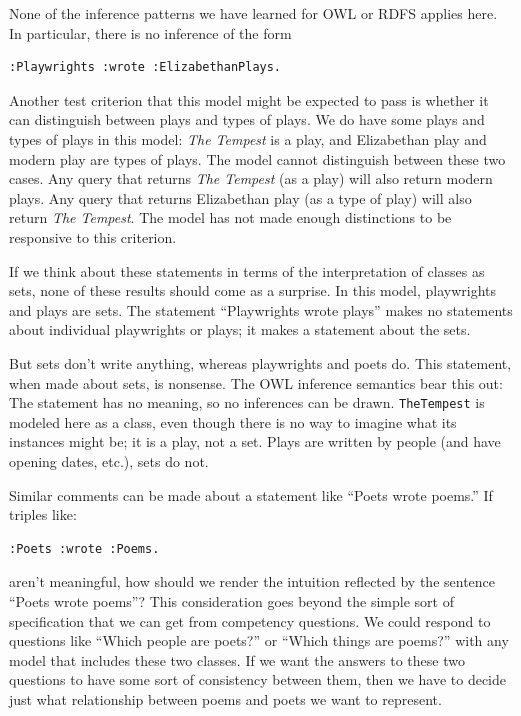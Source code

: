 None of the inference patterns we have learned for OWL or RDFS applies
here. In particular, there is no inference of the form

\begin{lstlisting}
:Playwrights :wrote :ElizabethanPlays.
\end{lstlisting}

Another test criterion that this model might be expected to pass is
whether it can distinguish between plays and types of plays. We do have
some plays and types of plays in this model: \emph{The Tempest} is a play, and
Elizabethan play and modern play are types of plays. The model cannot
distinguish between these two cases. Any query that returns \emph{The Tempest}
(as a play) will also return modern plays. Any query that returns
Elizabethan play (as a type of play) will also return \emph{The Tempest}. The
model has not made enough distinctions to be responsive to this
criterion.

If we think about these statements in terms of the interpretation of
classes as sets, none of these results should come as a surprise. In
this model, playwrights and plays are sets. The statement
``Playwrights wrote plays'' makes no statements about individual
playwrights or plays; it makes a statement about the sets.

But sets don't write anything, whereas playwrights and poets do. This
statement, when made about sets, is nonsense. The OWL inference
semantics bear this out: The statement has no meaning, so no inferences
can be drawn. \texttt{TheTempest} is modeled here as a class, even though there
is no way to imagine what its instances might be; it is a play, not a
set. Plays are written by people (and have opening dates, etc.), sets do
not.

Similar comments can be made about a statement like ``Poets wrote
poems.'' If triples like:

\begin{lstlisting}
:Poets :wrote :Poems.
\end{lstlisting}

aren't meaningful, how should we render the intuition reflected by the
sentence ``Poets wrote poems''? This consideration goes beyond the
simple sort of specification that we can get from competency questions.
We could respond to questions like ``Which people are poets?'' or
``Which things are poems?'' with any model that includes these two
classes. If we want the answers to these two questions to have some sort
of consistency between them, then we have to decide just what
relationship between poems and poets we want to represent.

